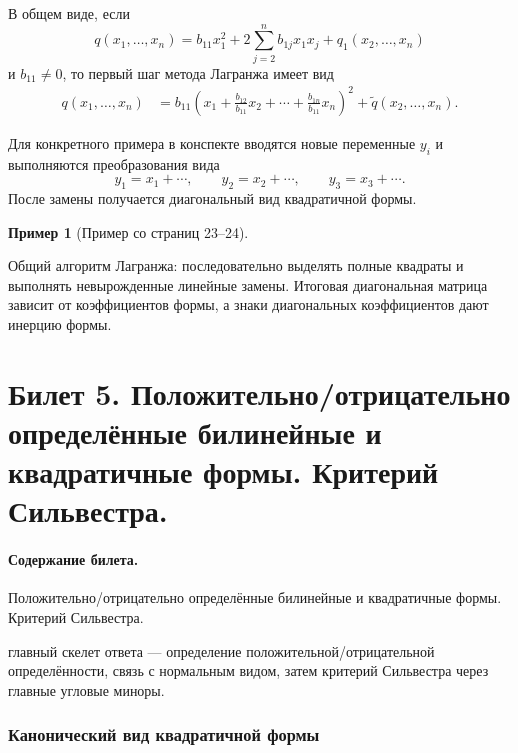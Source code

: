 \documentclass[12pt,a4paper]{article}
\theoremstyle{definition}
\newtheorem{example}[definition]{Пример}
\theoremstyle{plain}
\theoremstyle{remark}
\newenvironment{planadd}{\begin{planbox}}{\end{planbox}}
\newenvironment{knowledgefix}{\begin{clarifybox}}{\end{clarifybox}}
\begin{document}
В общем виде, если
\[
    q(x_1,\ldots,x_n)=b_{11}x_1^2+2\sum_{j=2}^n b_{1j}x_1x_j+q_1(x_2,\ldots,x_n)
\]
и $b_{11}\ne0$, то первый шаг метода Лагранжа имеет вид
\[
\begin{aligned}
    q(x_1,\ldots,x_n)
    &=b_{11}\left(x_1+\frac{b_{12}}{b_{11}}x_2+\cdots+\frac{b_{1n}}{b_{11}}x_n\right)^2
      +\widetilde q(x_2,\ldots,x_n).
\end{aligned}
\]

Для конкретного примера в конспекте вводятся новые переменные $y_i$ и выполняются преобразования вида
\[
    y_1=x_1+\cdots,
    \qquad
    y_2=x_2+\cdots,
    \qquad
    y_3=x_3+\cdots.
\]
После замены получается диагональный вид квадратичной формы.

\begin{example}[Пример со страниц 23--24]
\begin{knowledgefix}
Общий алгоритм Лагранжа: последовательно выделять полные квадраты и выполнять невырожденные линейные замены. Итоговая диагональная матрица зависит от коэффициентов формы, а знаки диагональных коэффициентов дают инерцию формы.
\end{knowledgefix}
\end{example}

\clearpage

\section{Билет 5. Положительно/отрицательно определённые билинейные и квадратичные формы. Критерий Сильвестра.}

\paragraph{Содержание билета.} Положительно/отрицательно определённые билинейные и квадратичные формы. Критерий Сильвестра.

\begin{planadd}

главный скелет ответа — определение положительной/отрицательной определённости, связь с нормальным видом, затем критерий Сильвестра через главные угловые миноры.

\end{planadd}

\subsubsection{Канонический вид квадратичной формы}
\end{document}
